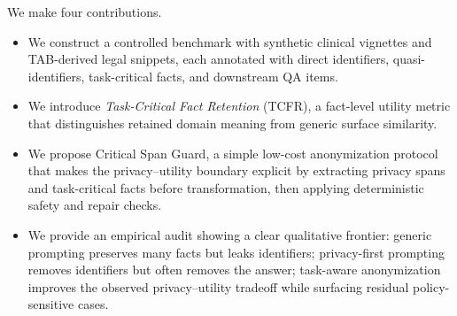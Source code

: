 \documentclass{article}
\newcommand{\method}{Critical Span Guard}
\newcommand{\tcfr}{TCFR}
\begin{document}
We make four contributions.
\begin{itemize}[leftmargin=*,nosep]
  \item We construct a controlled benchmark with synthetic clinical vignettes and
  TAB-derived legal snippets, each annotated with direct identifiers, quasi-
  identifiers, task-critical facts, and downstream QA items.
  \item We introduce \textit{Task-Critical Fact Retention} (\tcfr), a fact-level
  utility metric that distinguishes retained domain meaning from generic surface
  similarity.
  \item We propose \method, a simple low-cost anonymization protocol that makes
  the privacy--utility boundary explicit by extracting privacy spans and
  task-critical facts before transformation, then applying deterministic safety
  and repair checks.
  \item We provide an empirical audit showing a clear qualitative frontier:
  generic prompting preserves many facts but leaks identifiers; privacy-first
  prompting removes identifiers but often removes the answer; task-aware
  anonymization improves the observed privacy--utility tradeoff while surfacing
  residual policy-sensitive cases.
\end{itemize}
\end{document}
